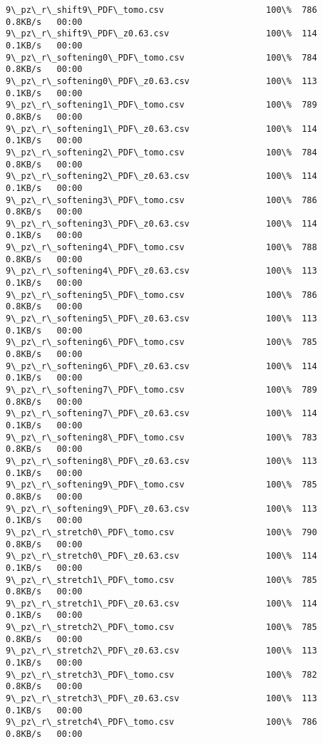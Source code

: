 \documentclass[11pt]{article}
\begin{document}
\begin{Verbatim}[commandchars=\\\{\}]
9\_pz\_r\_shift9\_PDF\_tomo.csv                    100\%  786     0.8KB/s   00:00    
9\_pz\_r\_shift9\_PDF\_z0.63.csv                   100\%  114     0.1KB/s   00:00    
9\_pz\_r\_softening0\_PDF\_tomo.csv                100\%  784     0.8KB/s   00:00    
9\_pz\_r\_softening0\_PDF\_z0.63.csv               100\%  113     0.1KB/s   00:00    
9\_pz\_r\_softening1\_PDF\_tomo.csv                100\%  789     0.8KB/s   00:00    
9\_pz\_r\_softening1\_PDF\_z0.63.csv               100\%  114     0.1KB/s   00:00    
9\_pz\_r\_softening2\_PDF\_tomo.csv                100\%  784     0.8KB/s   00:00    
9\_pz\_r\_softening2\_PDF\_z0.63.csv               100\%  114     0.1KB/s   00:00    
9\_pz\_r\_softening3\_PDF\_tomo.csv                100\%  786     0.8KB/s   00:00    
9\_pz\_r\_softening3\_PDF\_z0.63.csv               100\%  114     0.1KB/s   00:00    
9\_pz\_r\_softening4\_PDF\_tomo.csv                100\%  788     0.8KB/s   00:00    
9\_pz\_r\_softening4\_PDF\_z0.63.csv               100\%  113     0.1KB/s   00:00    
9\_pz\_r\_softening5\_PDF\_tomo.csv                100\%  786     0.8KB/s   00:00    
9\_pz\_r\_softening5\_PDF\_z0.63.csv               100\%  113     0.1KB/s   00:00    
9\_pz\_r\_softening6\_PDF\_tomo.csv                100\%  785     0.8KB/s   00:00    
9\_pz\_r\_softening6\_PDF\_z0.63.csv               100\%  114     0.1KB/s   00:00    
9\_pz\_r\_softening7\_PDF\_tomo.csv                100\%  789     0.8KB/s   00:00    
9\_pz\_r\_softening7\_PDF\_z0.63.csv               100\%  114     0.1KB/s   00:00    
9\_pz\_r\_softening8\_PDF\_tomo.csv                100\%  783     0.8KB/s   00:00    
9\_pz\_r\_softening8\_PDF\_z0.63.csv               100\%  113     0.1KB/s   00:00    
9\_pz\_r\_softening9\_PDF\_tomo.csv                100\%  785     0.8KB/s   00:00    
9\_pz\_r\_softening9\_PDF\_z0.63.csv               100\%  113     0.1KB/s   00:00    
9\_pz\_r\_stretch0\_PDF\_tomo.csv                  100\%  790     0.8KB/s   00:00    
9\_pz\_r\_stretch0\_PDF\_z0.63.csv                 100\%  114     0.1KB/s   00:00    
9\_pz\_r\_stretch1\_PDF\_tomo.csv                  100\%  785     0.8KB/s   00:00    
9\_pz\_r\_stretch1\_PDF\_z0.63.csv                 100\%  114     0.1KB/s   00:00    
9\_pz\_r\_stretch2\_PDF\_tomo.csv                  100\%  785     0.8KB/s   00:00    
9\_pz\_r\_stretch2\_PDF\_z0.63.csv                 100\%  113     0.1KB/s   00:00    
9\_pz\_r\_stretch3\_PDF\_tomo.csv                  100\%  782     0.8KB/s   00:00    
9\_pz\_r\_stretch3\_PDF\_z0.63.csv                 100\%  113     0.1KB/s   00:00    
9\_pz\_r\_stretch4\_PDF\_tomo.csv                  100\%  786     0.8KB/s   00:00    

\end{Verbatim}
\end{document}
